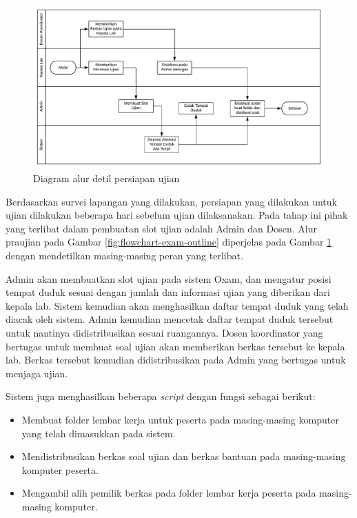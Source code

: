         \begin{figure}
            \centering
            \includegraphics[width=0.75\paperwidth]{Gambar/flowchart/exam-flow-ujian-pra.pdf}
            \caption{Diagram alur detil persiapan ujian}
            \label{fig:flowchart-exam-preexam}
        \end{figure}
        
        Berdasarkan survei lapangan yang dilakukan, persiapan yang dilakukan untuk ujian dilakukan beberapa hari sebelum ujian dilaksanakan. Pada tahap ini pihak yang terlibat dalam pembuatan slot ujian adalah Admin dan Dosen.
        Alur praujian pada Gambar \ref{fig:flowchart-exam-outline} diperjelas pada Gambar \ref{fig:flowchart-exam-preexam} dengan mendetilkan masing-masing peran yang terlibat.
        
        
        Admin akan membuatkan slot ujian pada sistem Oxam, dan mengatur posisi tempat duduk sesuai dengan jumlah dan informasi ujian yang diberikan dari kepala lab. Sistem kemudian akan menghasilkan daftar tempat duduk yang telah diacak oleh sistem.
        Admin kemudian mencetak daftar tempat duduk tersebut untuk nantinya didistribusikan sesuai ruangannya. Dosen koordinator yang bertugas untuk membuat soal ujian akan memberikan berkas tersebut ke kepala lab. Berkas tersebut kemudian didistribusikan pada Admin yang bertugas untuk menjaga ujian.
        
        Sistem juga menghasilkan beberapa \textit{script} dengan fungsi sebagai berikut:
        \begin{itemize}
            \item Membuat folder lembar kerja untuk peserta pada masing-masing komputer yang telah dimasukkan pada sistem.
            \item Mendistribusikan berkas soal ujian dan berkas bantuan pada masing-masing komputer peserta.
            \item Mengambil alih pemilik berkas pada folder lembar kerja peserta pada masing-masing komputer.
        \end{itemize}
        
